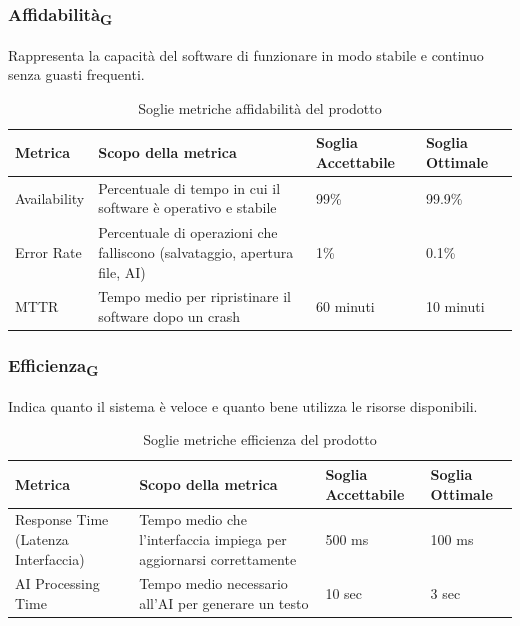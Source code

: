 \documentclass[11pt,a4paper]{article}
\begin{document}
\subsubsection{Affidabilità\textsubscript{G}}
Rappresenta la capacità del software di funzionare in modo stabile e continuo senza guasti frequenti.
\begin{table}[H]
\centering
\renewcommand{\arraystretch}{1.5}
\begin{tabular}{|M{0.25\textwidth}|M{0.35\textwidth}|M{0.15\textwidth}|M{0.15\textwidth}|}
\hline
\textbf{Metrica} & \textbf{Scopo della metrica} & \textbf{Soglia Accettabile} & \textbf{Soglia Ottimale} \\
\hline
Availability & Percentuale di tempo in cui il software è operativo e stabile & 99\% & 99.9\% \\ \hline
Error Rate & Percentuale di operazioni che falliscono (salvataggio, apertura file, AI) & 1\% & 0.1\% \\ \hline
MTTR & Tempo medio per ripristinare il software dopo un crash & 60 minuti & 10 minuti \\
\hline
\end{tabular}
\caption{Soglie metriche affidabilità del prodotto}
\end{table}

\subsubsection{Efficienza\textsubscript{G}}
Indica quanto il sistema è veloce e quanto bene utilizza le risorse disponibili.
\begin{table}[H]
\centering
\renewcommand{\arraystretch}{1.5}
\begin{tabular}{|M{0.25\textwidth}|M{0.35\textwidth}|M{0.15\textwidth}|M{0.15\textwidth}|}
\hline
\textbf{Metrica} & \textbf{Scopo della metrica} & \textbf{Soglia Accettabile} & \textbf{Soglia Ottimale} \\
\hline
Response Time (Latenza Interfaccia) & Tempo medio che l'interfaccia impiega per aggiornarsi correttamente & 500 ms & 100 ms \\ \hline
AI Processing Time & Tempo medio necessario all’AI per generare un testo & 10 sec & 3 sec \\
\hline
\end{tabular}
\caption{Soglie metriche efficienza del prodotto}
\end{table}
\end{document}
